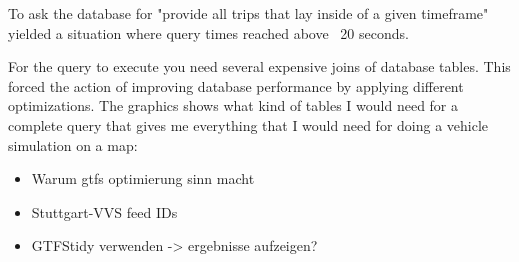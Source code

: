   To ask the database for "provide all trips that lay inside of a given timeframe" yielded a situation where query times reached above ~20 seconds.

  For the query to execute you need several expensive joins of database tables. This forced the action of improving database performance by applying different optimizations. The graphics shows what kind of tables I would need for a complete query that gives me everything that I would need for doing a vehicle simulation on a map:

  \begin{itemize}
    \item Warum gtfs optimierung sinn macht
    \item Stuttgart-VVS feed IDs 
    \item GTFStidy verwenden -> ergebnisse aufzeigen?
  \end{itemize}
